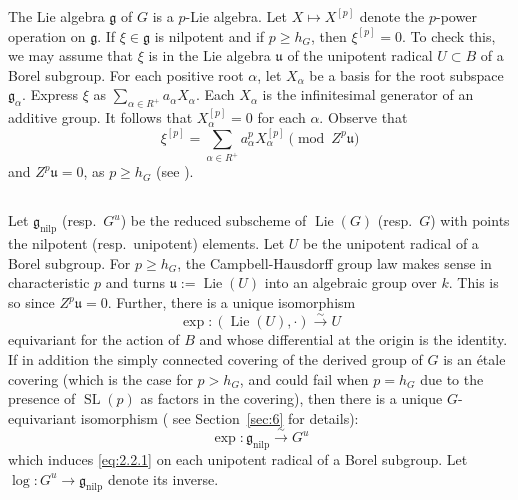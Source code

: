 \documentclass[11pt,a4paper]{article}
\theoremstyle{plain}
\theoremstyle{definition}
\DeclareMathOperator{\Lie}{Lie}
\DeclareMathOperator{\SL}{SL}
\newcommand{\nilp}{\mathrm{nilp}}
\begin{document}
The Lie algebra $\mathfrak{g}$ of $G$ is a $p$-Lie algebra. Let $X \mapsto X^{[p]}$ denote the $p$-power operation on $\mathfrak{g}$. If $\xi \in \mathfrak{g}$ is nilpotent and if $p \geq h_G$, then $\xi^{[p]} = 0$. To check this, we may assume that $\xi$ is in the Lie algebra $\mathfrak{u}$ of the unipotent radical $U \subset B$ of a Borel subgroup. For each positive root $\alpha$, let $X_\alpha$ be a basis for the root subspace $\mathfrak{g}_\alpha$. Express $\xi$ as $\sum_{\alpha \in R^+} a_\alpha X_\alpha$. Each $X_\alpha$ is the infinitesimal generator of an additive group. It follows that $X_\alpha^{[p]} = 0$ for each $\alpha$. Observe that
\begin{equation} \label{eq:2.1.3}
\xi^{[p]} = \sum_{\alpha \in R^+} a_\alpha^p X_\alpha^{[p]} \pmod{Z^p\mathfrak{u}}
\end{equation}
and $Z^p\mathfrak{u} = 0$, as $p \geq h_G$ (see \cite[page~10]{Mc1}).

\subsection{} \label{sec:2.2}
Let $\mathfrak{g}_\nilp$ (resp.~$G^u$) be the reduced subscheme of $\Lie(G)$ (resp.~$G$) with points the nilpotent (resp.~unipotent) elements. Let $U$ be the unipotent radical of a Borel subgroup. For $p \geq h_G$, the Campbell-Hausdorff group law makes sense in characteristic $p$ and turns $\mathfrak{u} := \Lie(U)$ into an algebraic group over $k$. This is so since $Z^p\mathfrak{u} = 0$. Further, there is a unique isomorphism
\begin{equation} \label{eq:2.2.1}
\exp : (\Lie(U), \cdot) \xrightarrow{\sim} U
\end{equation}
equivariant for the action of $B$ and whose differential at the origin is the identity. If in addition the simply connected covering of the derived group of $G$ is an \'etale covering (which is the case for $p > h_G$, and could fail when $p = h_G$ due to the presence of $\SL(p)$ as factors in the covering), then there is a unique $G$-equivariant isomorphism (\cite[Theorem~3, page~21]{S2} see Section~\ref{sec:6} for details):
\begin{equation} \label{eq:2.2.2}
\exp : \mathfrak{g}_\nilp \xrightarrow{\sim} G^u
\end{equation}
which induces \eqref{eq:2.2.1} on each unipotent radical of a Borel subgroup. Let $\log : G^u \to \mathfrak{g}_\nilp$ denote its inverse.
\end{document}
